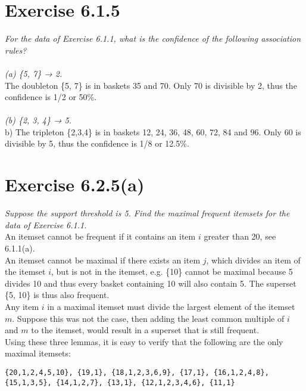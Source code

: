 \documentclass{article}
\begin{document}
\section*{Exercise 6.1.5}
\textit{For the data of Exercise 6.1.1, what is the confidence of the following association rules?}
\\
\\
\textit{(a) \{5, 7\} → 2.}
\\
The doubleton \{5, 7\} is in baskets 35 and 70. Only 70 is divisible by 2, thus the confidence is 1/2 or 50\%.
\\
\\
\textit{(b) \{2, 3, 4\} → 5.}
\\
b) The tripleton \{2,3,4\} is in baskets 12, 24, 36, 48, 60, 72, 84 and 96. Only 60 is divisible by 5,
thus the confidence is 1/8 or 12.5\%.
\section*{Exercise 6.2.5(a)}
\textit{Suppose the support threshold is 5. Find the maximal frequent itemsets for the data of Exercise 6.1.1.}
\\
An itemset cannot be frequent if it contains an item $i$ greater than 20, see 6.1.1(a).\\
An itemset cannot be maximal if there exists an item $j$, which divides an item of the itemset $i$, but is not in the itemset,
e.g. \{10\} cannot be maximal because 5 divides 10 and thus every basket containing 10 will also contain 5.
The superset \{5, 10\} is thus also frequent.\\
Any item $i$ in a maximal itemset must divide the largest element of the itemset $m$.
Suppose this was not the case, then adding the least common multiple of $i$ and $m$ to the itemset,
would result in a superset that is still frequent.\\
Using these three lemmas, it is easy to verify that the following are the only maximal itemsets:
\begin{verbatim}
{20,1,2,4,5,10}, {19,1}, {18,1,2,3,6,9}, {17,1}, {16,1,2,4,8},
{15,1,3,5}, {14,1,2,7}, {13,1}, {12,1,2,3,4,6}, {11,1}
\end{verbatim}
\end{document}
